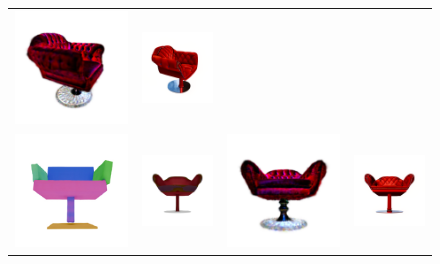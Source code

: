 \begin{figure}
{\begin{tabular}{cccc}
                \includegraphics[width=0.24\linewidth, trim=60 60 100 90, clip]{images/editings/spice-e/velvet_chair/sds/1.png} &
                \includegraphics[width=0.24\linewidth, trim=40 40 60 60, clip]{images/editings/spice-e/velvet_chair/sharp-e/a_red_velvet_chair_2_75_steps_batch_0_a_chesterfield_light_red_velvet_chair_tile_0.png} \\
                \includegraphics[width=0.24\linewidth, trim=40 50 40 60, clip]{images/editings/spice-e/velvet_chair/guidance/chair_0001.jpg} &
                \includegraphics[width=0.24\linewidth, trim=40 50 40 60, clip]{images/editings/spice-e/velvet_chair/spice-e/shap-e_tile_1.png} &
                \includegraphics[width=0.24\linewidth, trim=50 60 50 90, clip]{images/editings/spice-e/velvet_chair/sds/0.png} &
                \includegraphics[width=0.24\linewidth, trim=40 50 40 60, clip]{images/editings/spice-e/velvet_chair/sharp-e/a_red_velvet_chair_2_75_steps_batch_0_a_chesterfield_light_red_velvet_chair_tile_1.png} \\
                

\end{tabular}}
\end{figure}
